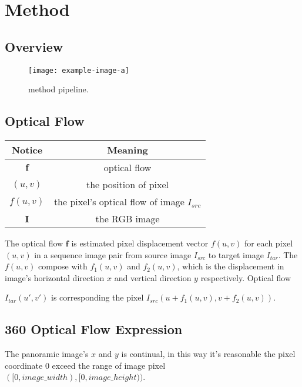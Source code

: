 \section{Method}\label{sec:method}

\subsection{Overview}


\begin{figure}[hbt!]
	\centering
	\texttt{[image: example-image-a]}
	\caption{method pipeline.}
\label{fig:method:pipeline}
\end{figure}



\subsection{Optical Flow}

\begin{center}
	\begin{tabular}{ c | c } 
		\hline
		Notice & Meaning  \\ [0.5ex] 
		\hline\hline
		$\textbf{f}$ & optical flow  \\ 
		\hline
		$(u,v)$ & the position of pixel   \\
		\hline
		$f(u,v)$ & the pixel's optical flow of image $I_{src}$ \\
		\hline
		$\textbf{I}$ & the RGB image  \\ [1ex] 
		\hline
	\end{tabular}
\end{center}

The optical flow $\textbf{f}$ is estimated pixel displacement vector $f(u,v)$ for each pixel $(u,v)$ in a sequence image pair from source image $I_{src}$ to target image $I_{tar}$.
The $f(u,v)$ compose with $f_1(u,v)$ and $f_2(u,v)$, which is the displacement in image's horizontal direction $x$ and vertical direction $y$ respectively.
Optical flow 

$I_{tar}(u',v')$ is corresponding the pixel $I_{src}(u + f_1(u,v), v + f_2(u,v))$.


\subsection{360 Optical Flow Expression}

The panoramic image's $x$ and $y$ is continual, in this way it's reasonable the pixel coordinate 0 exceed the range of image pixel $([0, image\_width), [0, image\_height))$. 

